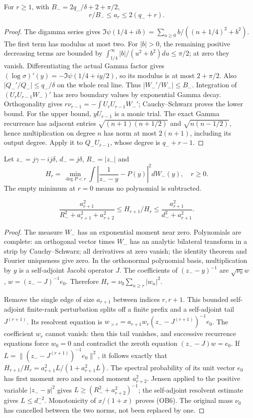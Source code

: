 \begin{lemma}
For $r\ge1$, with $B_-=2q_-/\delta+2+\pi/2$,
\[
 r/B_-\le a_r\le2(q_-+r).\tag{OB4}
\]
\end{lemma}
\begin{proof}
The digamma series \cite[5.7.6]{DLMF5} gives
$\Im\psi(1/4+ib)=\sum_{n\ge0}b/((n+1/4)^2+b^2)$.
The first term has modulus at most two. For $|b|>0$, the remaining
positive decreasing terms are bounded by
$\int_{1/4}^\infty |b|/(u^2+b^2)du\le\pi/2$; at zero they vanish.
Differentiating the actual Gamma factor gives
$(\log\sigma)'(y)=-\Im\psi(1/4+iy/2)$, so its modulus is at most
$2+\pi/2$. Also $|Q_-'/Q_-|\le q_-/\delta$ on the whole real line.
Thus $|W_-'/W_-|\le B_-$. Integration of
$(U_rU_{r-1}W_-)'$ has zero boundary values by exponential Gamma
decay. Orthogonality gives
$r\nu_{r-1}=-\int U_rU_{r-1}W_-'$; Cauchy--Schwarz proves the
lower bound. For the upper bound, $yU_{r-1}$ is a monic trial.
The exact Gamma recurrence has adjacent entries
$\sqrt{(n+1)(n+1/2)}$ and $\sqrt{n(n-1/2)}$, hence multiplication
on degree $n$ has norm at most $2(n+1)$, including its output degree.
Apply it to $Q_-U_{r-1}$, whose degree is $q_-+r-1$.
\end{proof}

Let $z_-=j\gamma-ij\delta$, $d_-=j\delta$, $R_-=|z_-|$ and
\[
 H_r=\min_{\deg P<r}\int\left|\frac1{z_--y}-P(y)\right|^2dW_-(y),
 \quad r\ge0.\tag{OB5}
\]
The empty minimum at $r=0$ means no polynomial is subtracted.
\begin{lemma}
\[
 \frac{a_{r+1}^2}{R_-^2+a_{r+1}^2+a_{r+2}^2}
 \le H_{r+1}/H_r\le
 \frac{a_{r+1}^2}{d_-^2+a_{r+1}^2}.\tag{OB6}
\]
\end{lemma}
\begin{proof}
The measure $W_-$ has an exponential moment near zero. Polynomials
are complete: an orthogonal vector times $W_-$ has an analytic
bilateral transform in a strip by Cauchy--Schwarz; all derivatives
at zero vanish; the identity theorem and Fourier uniqueness give zero.
In the orthonormal polynomial basis, multiplication by $y$ is a
self-adjoint Jacobi operator $J$. The coefficients of $(z_--y)^{-1}$
are $\sqrt{\nu_0}w$, $w=(z_--J)^{-1}e_0$. Therefore
$H_r=\nu_0\sum_{n\ge r}|w_n|^2$.

Remove the single edge of size $a_{r+1}$ between indices $r,r+1$.
This bounded self-adjoint finite-rank perturbation splits off a finite
prefix and a self-adjoint tail $J^{(r+1)}$. Its resolvent equation is
$w_{>r}=a_{r+1}w_r(z_--J^{(r+1)})^{-1}e_0$.
The coefficient $w_r$ cannot vanish: then this tail vanishes, and
successive recurrence equations force $w_0=0$ and contradict the
zeroth equation $(z_--J)w=e_0$.
If $L=\|(z_--J^{(r+1)})^{-1}e_0\|^2$, it follows exactly that
$H_{r+1}/H_r=a_{r+1}^2L/(1+a_{r+1}^2L)$.
The spectral probability of its unit vector $e_0$ has first moment
zero and second moment $a_{r+2}^2$. Jensen applied to the positive
variable $|z_--y|^2$ gives $L\ge(R_-^2+a_{r+2}^2)^{-1}$;
the self-adjoint resolvent estimate gives $L\le d_-^{-2}$.
Monotonicity of $x/(1+x)$ proves (OB6). The original mass $\nu_0$
has cancelled between the two norms, not been replaced by one.
\end{proof}

